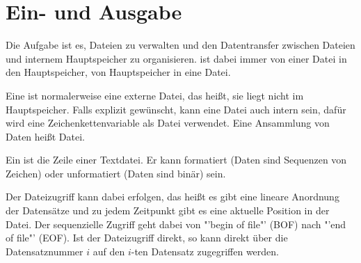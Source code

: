 \section{Ein- und Ausgabe}

Die Aufgabe ist es, Dateien zu verwalten und den Datentransfer zwischen Dateien und internem Hauptspeicher zu organisieren.  ist dabei immer von einer Datei in den Hauptspeicher,  von Hauptspeicher in eine Datei.

Eine  ist normalerweise eine externe Datei, das heißt, sie liegt nicht im Hauptspeicher. Falls explizit gewünscht, kann eine Datei auch intern sein, dafür wird eine Zeichenkettenvariable als Datei verwendet. Eine Ansammlung von Daten heißt Datei. 

Ein  ist die Zeile einer Textdatei. Er kann formatiert (Daten sind Sequenzen von Zeichen) oder unformatiert (Daten sind binär) sein.

Der Dateizugriff kann dabei  erfolgen, das heißt es gibt eine lineare Anordnung der Datensätze und zu jedem Zeitpunkt gibt es eine aktuelle Position in der Datei. Der sequenzielle Zugriff geht dabei von "'begin of file"' (BOF) nach "'end of file"' (EOF). Ist der Dateizugriff direkt, so kann direkt über die Datensatznummer $i$ auf den $i$-ten Datensatz zugegriffen werden.